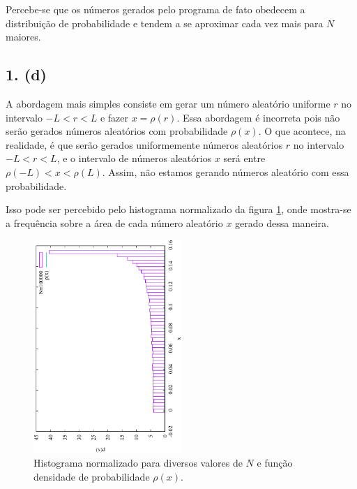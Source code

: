 \documentclass[brazilian, 12pt, a4paper, final]{article}
\begin{document}
Percebe-se que os números gerados pelo programa de fato obedecem a distribuição de probabilidade e tendem a se aproximar cada vez mais para $N$ maiores.

\subsection*{1. (d)}
A abordagem mais simples consiste em gerar um número aleatório uniforme $r$ no intervalo $-L<r<L$ e fazer $x=\rho(r)$. Essa abordagem é incorreta pois não serão gerados números aleatórios com probabilidade $\rho(x)$. O que acontece, na realidade, é que serão gerados uniformemente números aleatórios $r$ no intervalo $-L<r<L$, e o intervalo de números aleatórios $x$ será entre $\rho(-L)<x<\rho(L)$. Assim, não estamos gerando números aleatório com essa probabilidade. 

Isso pode ser percebido pelo histograma normalizado da figura \ref{fig:Q1d}, onde mostra-se a frequência sobre a área de cada número  aleatório $x$ gerado dessa maneira.

\begin{figure}[htbp]
  \centering
  \includegraphics[width=0.5\textwidth,angle=-90]{Q1/NormQ1d.eps}
  \caption{Histograma normalizado para diversos valores de $N$ e função densidade de probabilidade $\rho(x)$.}
  \label{fig:Q1d}
\end{figure}
\end{document}
